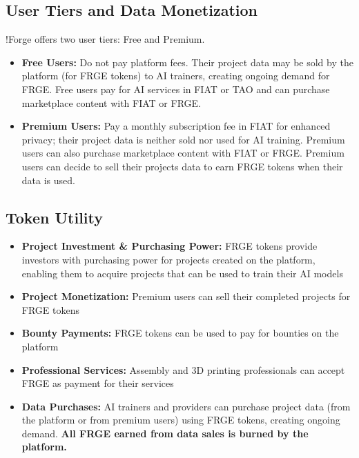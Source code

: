 
\subsection*{User Tiers and Data Monetization}

!Forge offers two user tiers: Free and Premium.

\begin{itemize}[leftmargin=*]
    \item \textbf{\textcolor{fabPrimary}{Free Users:}} Do not pay platform fees. Their project data may be sold by the platform (for FRGE tokens) to AI trainers, creating ongoing demand for FRGE. Free users pay for AI services in FIAT or TAO and can purchase marketplace content with FIAT or FRGE.
    \item \textbf{\textcolor{fabSecondary}{Premium Users:}} Pay a monthly subscription fee in FIAT for enhanced privacy; their project data is neither sold nor used for AI training. Premium users can also purchase marketplace content with FIAT or FRGE. Premium users can decide to sell their projects data to earn FRGE tokens when their data is used.
\end{itemize}

\subsection*{Token Utility}
\begin{itemize}[leftmargin=*]
    \item \textbf{\textcolor{fabPrimary}{Project Investment \& Purchasing Power:}} FRGE tokens provide investors with purchasing power for projects created on the platform, enabling them to acquire projects that can be used to train their AI models
    \item \textbf{\textcolor{fabPrimary}{Project Monetization:}} Premium users can sell their completed projects for FRGE tokens
    \item \textbf{\textcolor{fabPrimary}{Bounty Payments:}} FRGE tokens can be used to pay for bounties on the platform
    \item \textbf{\textcolor{fabPrimary}{Professional Services:}} Assembly and 3D printing professionals can accept FRGE as payment for their services
    \item \textbf{\textcolor{fabPrimary}{Data Purchases:}} AI trainers and providers can purchase project data (from the platform or from premium users) using FRGE tokens, creating ongoing demand. \textbf{All FRGE earned from data sales is burned by the platform.}
\end{itemize}

